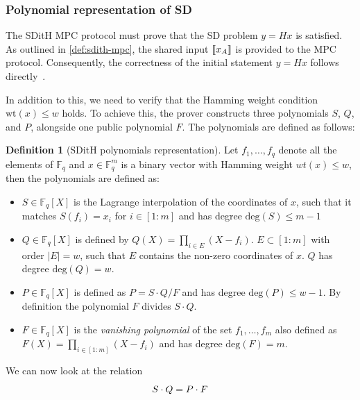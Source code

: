 \documentclass[11pt]{report}
\theoremstyle{definition}
\newtheorem{definition}{Definition}[section]
\theoremstyle{plain}
\begin{document}
\subsubsection{Polynomial representation of SD}\label{sec:polynomial_representation}

The SDitH MPC protocol must prove that the SD problem $ y = Hx $ is satisfied. As outlined in \autoref{def:sdith-mpc}, the shared input $\llbracket x_A \rrbracket$ is provided to the MPC protocol. Consequently, the correctness of the initial statement $ y = Hx $ follows directly~\cite{feneuil2022syndrome}.

In addition to this, we need to verify that the Hamming weight condition $ \text{wt}(x) \leq w $ holds. To achieve this, the prover constructs three polynomials $ S $, $ Q $, and $ P $, alongside one public polynomial $ F $. The polynomials are defined as follows:

\begin{definition}[SDitH polynomials representation]\label{def:sdith-polynomials}
  Let $f_1,\dots, f_q$ denote all the elements of $\mathbb{F}_q$ and $x\in \mathbb{F}^m_q$ is a binary vector with Hamming weight $wt(x) \leq w$, then the polynomials are defined as:
  \begin{itemize}
    \item $S\in \mathbb{F}_q[X]$ is the Lagrange interpolation of the coordinates of $x$, such that it matches $S(f_i) = x_i$ for $i\in [1:m]$ and has degree $\text{deg}(S) \leq m-1$
    \item $Q\in \mathbb{F}_q[X]$ is defined by $Q(X) = \prod_{i\in E}(X - f_i)$. $E \subset [1:m]$ with order $|E| = w$, such that $E$ contains the non-zero coordinates of $x$. $Q$ has degree $\text{deg}(Q) = w$.
    \item $P\in \mathbb{F}_q[X]$ is defined as $P = S\cdot Q/F$ and has degree $\text{deg}(P) \leq w-1$. By definition the polynomial $F$ divides $S\cdot Q$.
    \item $F\in \mathbb{F}_q[X]$ is the \textit{vanishing polynomial} of the set ${f_1, \dots, f_m}$ also defined as $F(X) = \prod_{i\in [1:m]}(X - f_i)$ and has degree $\text{deg}(F) = m$.
  \end{itemize}
\end{definition}

\noindent We can now look at the relation
\begin{equation}
  \centering
  S\cdot Q = P\cdot F\label{eq:polynomial_representation}
\end{equation}
\end{document}

